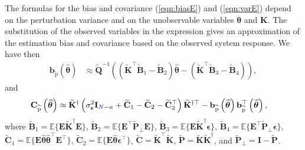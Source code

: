 The formulas for the bias and covariance (\ref{eqn:biasE}) and (\ref{eqn:varE}) depend on the perturbation variance and on the unobservable variables $\bm{\theta}$ and $\mathbf{K}$.
The substitution of the observed variables in the expression gives an approximation of the estimation bias and covariance based on the observed system response.
We have then
\begin{equation} \begin{aligned} \mathbf{b}_{\widetilde{\mathrm{p}}} \left( \widehat{\bm{\theta}} \right) & \approx \widetilde{\mathbf{Q}}^{-1} \left( \left( \widetilde{\mathbf{K}}^\top \widetilde{\mathbf{B}}_1 - \widetilde{\mathbf{B}}_2 \right) \widehat{\bm{\theta}} - \left( \widetilde{\mathbf{K}}^\top \widetilde{\mathbf{B}}_3 - \widetilde{\mathbf{B}}_4 \right) \right), \end{aligned} \label{eqn:biasST} \end{equation}
and
\begin{equation} \begin{aligned} \mathbf{C}_{\widetilde{\mathrm{p}}} \left( \widehat{\bm{\theta}} \right) & \approx \widetilde{\mathbf{K}}^\dagger \left( \sigma_{\bm{\epsilon}}^2 \mathbf{I}_{\color{blue}N\color{black}-n} + \widetilde{\mathbf{C}}_1 - \widetilde{\mathbf{C}}_2 - \widetilde{\mathbf{C}}_2^\top \right) \widetilde{\mathbf{K}}^{\dagger \top} - \mathbf{b}_{\widetilde{\mathrm{p}}} \left( \widehat{\bm{\theta}} \right) \mathbf{b}_{\widetilde{\mathrm{p}}}^\top \left( \widehat{\bm{\theta}} \right) , \end{aligned} \label{eqn:varST} \end{equation}
where $\widetilde{\mathbf{B}}_1 = \mathbb{E} \Big\{ \mathbf{E} \widetilde{\mathbf{K}}^\dagger \mathbf{E} \Big\}$, $\widetilde{\mathbf{B}}_2 = \mathbb{E} \Big\{ \mathbf{E}^\top \widetilde{\mathbf{P}}_\perp \mathbf{E} \Big\}$, $\widetilde{\mathbf{B}}_3 = \mathbb{E} \Big\{ \mathbf{E} \widetilde{\mathbf{K}}^\dagger \bm{\epsilon} \Big\}$, $\widetilde{\mathbf{B}}_4 = \mathbb{E} \Big\{ \mathbf{E}^\top \widetilde{\mathbf{P}}_\perp \bm{\epsilon} \Big\}$, $\widetilde{\mathbf{C}}_1 = \mathbb{E} \Big\{ \mathbf{E} \widehat{\bm{\theta}} \widehat{\bm{\theta}}^\top \mathbf{E}^\top \Big\}$, $\widetilde{\mathbf{C}}_2 = \mathbb{E} \Big\{ \mathbf{E} \widehat{\bm{\theta}} \bm{\epsilon}^\top \Big\}$, $\widetilde{\mathbf{C}} = \widetilde{\mathbf{K}}^\top \widetilde{\mathbf{K}}$, $\widetilde{\mathbf{P}} = \widetilde{\mathbf{K}} \widetilde{\mathbf{K}}^\dagger$, and $\widetilde{\mathbf{P}}_\perp = \mathbf{I} - \widetilde{\mathbf{P}}$.

